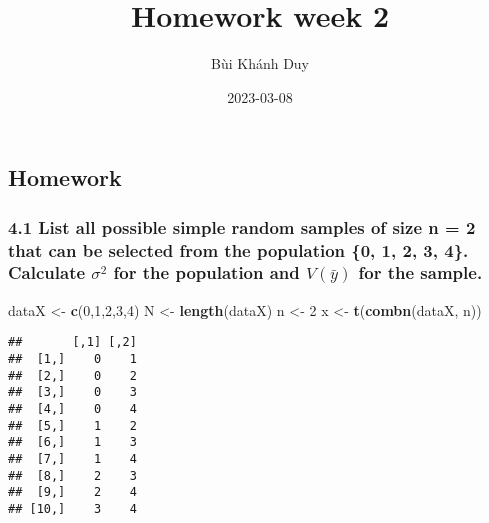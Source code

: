 \documentclass[
]{article}
\title{Homework week 2}
\author{Bùi Khánh Duy}
\date{2023-03-08}
\newenvironment{Shaded}{\begin{snugshade}}{\end{snugshade}}
\newcommand{\DecValTok}[1]{\textcolor[rgb]{0.27,0.67,0.26}{#1}}
\newcommand{\FunctionTok}[1]{\textcolor[rgb]{1.00,0.58,0.35}{\textbf{#1}}}
\newcommand{\NormalTok}[1]{\textcolor[rgb]{0.74,0.68,0.62}{#1}}
\newcommand{\OtherTok}[1]{\textcolor[rgb]{0.74,0.68,0.62}{#1}}
\begin{document}
\maketitle

\hypertarget{homework}{%
\subsection{Homework}\label{homework}}

\hypertarget{list-all-possible-simple-random-samples-of-size-n-2-that-can-be-selected-from-the-population-0-1-2-3-4.-calculate-sigma-2-for-the-population-and-vbary-for-the-sample.}{%
\subsubsection{\texorpdfstring{4.1 List all possible simple random
samples of size n = 2 that can be selected from the population \{0, 1,
2, 3, 4\}. Calculate \(\sigma^ 2\) for the population and \(V(\bar{y})\)
for the
sample.}{4.1 List all possible simple random samples of size n = 2 that can be selected from the population \{0, 1, 2, 3, 4\}. Calculate \textbackslash sigma\^{} 2 for the population and V(\textbackslash bar\{y\}) for the sample.}}\label{list-all-possible-simple-random-samples-of-size-n-2-that-can-be-selected-from-the-population-0-1-2-3-4.-calculate-sigma-2-for-the-population-and-vbary-for-the-sample.}}

\begin{Shaded}
\begin{Highlighting}[]
\NormalTok{dataX }\OtherTok{\textless{}{-}} \FunctionTok{c}\NormalTok{(}\DecValTok{0}\NormalTok{,}\DecValTok{1}\NormalTok{,}\DecValTok{2}\NormalTok{,}\DecValTok{3}\NormalTok{,}\DecValTok{4}\NormalTok{)}
\NormalTok{N }\OtherTok{\textless{}{-}} \FunctionTok{length}\NormalTok{(dataX)}
\NormalTok{n }\OtherTok{\textless{}{-}} \DecValTok{2}
\NormalTok{x }\OtherTok{\textless{}{-}} \FunctionTok{t}\NormalTok{(}\FunctionTok{combn}\NormalTok{(dataX, n))}
\end{Highlighting}
\end{Shaded}

\begin{verbatim}
##       [,1] [,2]
##  [1,]    0    1
##  [2,]    0    2
##  [3,]    0    3
##  [4,]    0    4
##  [5,]    1    2
##  [6,]    1    3
##  [7,]    1    4
##  [8,]    2    3
##  [9,]    2    4
## [10,]    3    4
\end{verbatim}
\end{document}
